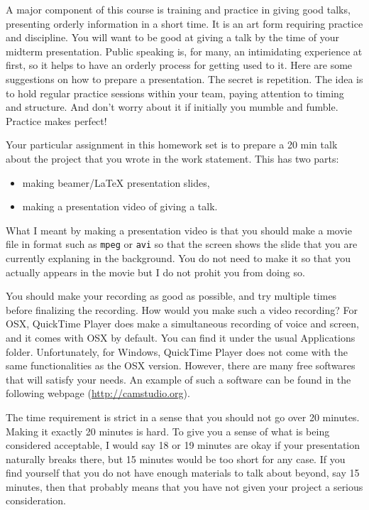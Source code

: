 \documentclass[12pt]{article}
\begin{document}
A major component of this course is training and practice in
giving good talks, presenting orderly information in a short
time. It is an art form requiring practice and discipline. You will
want to be good at giving a talk by the time of your midterm
presentation.  Public speaking is, for many, an intimidating experience at first, so
it helps to have an orderly process for getting used to it. Here are
some suggestions on how to prepare a presentation. 
The secret is repetition. The idea is to hold regular
practice sessions within your team, paying attention to timing and
structure. And don't worry about it if initially you mumble and
fumble. Practice makes perfect!

Your particular assignment in this homework set is to prepare a 20 min 
talk about the project that  you wrote in the work statement. This has two 
parts: 
\begin{itemize}
\item making beamer/LaTeX presentation slides,
\item making a presentation video of giving a talk.
\end{itemize}

What I meant by making a presentation video 
is that you should make a movie file in format such as 
\texttt{mpeg} or \texttt{avi} so that 
the screen shows the slide that you 
are currently explaning in the background.
You do not need to make it so that you actually 
appears in the movie but I do not prohit you from doing so. 

You should make your recording as good as possible,
and try multiple times before finalizing the recording. 
How would you make such a video recording? 
For OSX, QuickTime Player does make a 
simultaneous recording of voice and screen, and it 
comes with OSX by default. You can find it under 
the usual Applications folder.  
Unfortunately, for Windows, QuickTime Player does not 
come with the same functionalities as the OSX version. However, 
there are many  free softwares that will satisfy your needs. 
An example of such a software can be found in the following webpage
(\url{http://camstudio.org}).

The time requirement is strict in a sense that 
you should not go over 20 minutes. Making 
it exactly 20 minutes is hard. To give you a sense of  
what is being considered acceptable, 
I would say 18 or 19 minutes 
are okay if your presentation naturally breaks there,
but 15 minutes would be too short for any case. 
If you find yourself that you do not have enough 
materials to talk about beyond, say 15 minutes, 
then that probably means that you have not given your project a
serious consideration.
\end{document}
